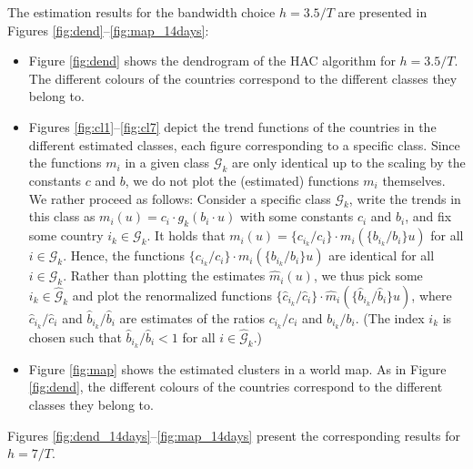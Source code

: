 \documentclass[a4paper,12pt]{article}
\numberwithin{equation}{section}
\begin{document}
The estimation results for the bandwidth choice $h=3.5/T$ are presented in Figures \ref{fig:dend}--\ref{fig:map_14days}:
\begin{itemize}[leftmargin=0.6cm]
\item Figure \ref{fig:dend} shows the dendrogram of the HAC algorithm for $h = 3.5/T$. The different colours of the countries correspond to the different classes they belong to. 
\item Figures \ref{fig:cl1}--\ref{fig:cl7} depict the trend functions of the countries in the different estimated classes, each figure corresponding to a specific class. Since the functions $m_i$ in a given class $\mathcal{G}_k$ are only identical up to the scaling by the constants $c$ and $b$, we do not plot the (estimated) functions $m_i$ themselves. We rather proceed as follows: Consider a specific class $\mathcal{G}_k$,  write the trends in this class as $m_i(u) = c_i \cdot g_k(b_i \cdot u)$ with some constants $c_i$ and $b_i$, and fix some country $i_k \in \mathcal{G}_k$. It holds that $m_i(u) = \{ c_{i_k}/c_i \} \cdot m_i(\{ b_{i_k}/b_i \} u)$ for all $i \in \mathcal{G}_k$. Hence, the functions $\{ c_{i_k}/c_i \} \cdot m_i(\{ b_{i_k}/b_i \} u)$ are identical for all $i \in \mathcal{G}_k$. Rather than plotting the estimates $\hat{m}_i(u)$, we thus pick some $i_k \in \hat{\mathcal{G}}_k$ and plot the renormalized functions $\{ \hat{c}_{i_k}/\hat{c}_i \} \cdot \hat{m}_i(\{ \hat{b}_{i_k}/\hat{b}_i \} u)$, where $\hat{c}_{i_k}/\hat{c}_i$ and $\hat{b}_{i_k}/\hat{b}_i$ are estimates of the ratios $c_{i_k}/c_i$ and $b_{i_k}/b_i$. (The index $i_k$ is chosen such that $\hat{b}_{i_k}/\hat{b}_i < 1$ for all $i \in \hat{\mathcal{G}}_k$.) 
\item Figure \ref{fig:map} shows the estimated clusters in a world map. As in Figure \ref{fig:dend}, the different colours of the countries correspond to the different classes they belong to. 
\end{itemize}
Figures \ref{fig:dend_14days}--\ref{fig:map_14days} present the corresponding results for $h=7/T$. 




\end{document}
